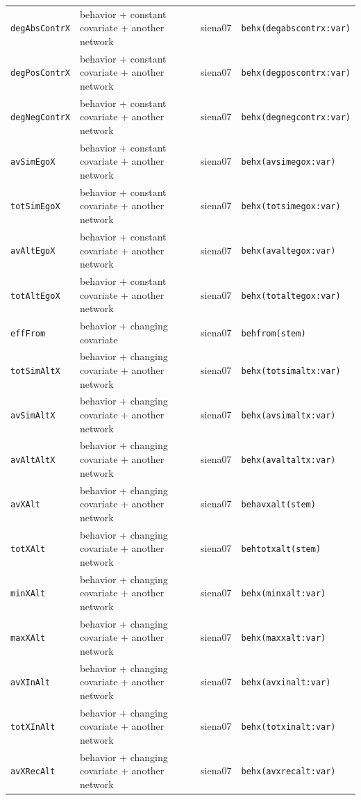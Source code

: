 \begin{longtable}{@{}p{2.6cm}p{3.2cm}p{2.9cm}p{5.4cm}@{}}
\texttt{degAbsContrX} & behavior + constant covariate + another network & siena07 & \texttt{behx(degabscontrx:var)}\\
\texttt{degPosContrX} & behavior + constant covariate + another network & siena07 & \texttt{behx(degposcontrx:var)}\\
\texttt{degNegContrX} & behavior + constant covariate + another network & siena07 & \texttt{behx(degnegcontrx:var)}\\
\texttt{avSimEgoX} & behavior + constant covariate + another network & siena07 & \texttt{behx(avsimegox:var)}\\
\texttt{totSimEgoX} & behavior + constant covariate + another network & siena07 & \texttt{behx(totsimegox:var)}\\
\texttt{avAltEgoX} & behavior + constant covariate + another network & siena07 & \texttt{behx(avaltegox:var)}\\
\texttt{totAltEgoX} & behavior + constant covariate + another network & siena07 & \texttt{behx(totaltegox:var)}\\
\texttt{effFrom} & behavior + changing covariate & siena07 & \texttt{behfrom(stem)}\\
\texttt{totSimAltX} & behavior + changing covariate + another network & siena07 & \texttt{behx(totsimaltx:var)}\\
\texttt{avSimAltX} & behavior + changing covariate + another network & siena07 & \texttt{behx(avsimaltx:var)}\\
\texttt{avAltAltX} & behavior + changing covariate + another network & siena07 & \texttt{behx(avaltaltx:var)}\\
\texttt{avXAlt} & behavior + changing covariate + another network & siena07 & \texttt{behavxalt(stem)}\\
\texttt{totXAlt} & behavior + changing covariate + another network & siena07 & \texttt{behtotxalt(stem)}\\
\texttt{minXAlt} & behavior + changing covariate + another network & siena07 & \texttt{behx(minxalt:var)}\\
\texttt{maxXAlt} & behavior + changing covariate + another network & siena07 & \texttt{behx(maxxalt:var)}\\
\texttt{avXInAlt} & behavior + changing covariate + another network & siena07 & \texttt{behx(avxinalt:var)}\\
\texttt{totXInAlt} & behavior + changing covariate + another network & siena07 & \texttt{behx(totxinalt:var)}\\
\texttt{avXRecAlt} & behavior + changing covariate + another network & siena07 & \texttt{behx(avxrecalt:var)}\\

\end{longtable}
